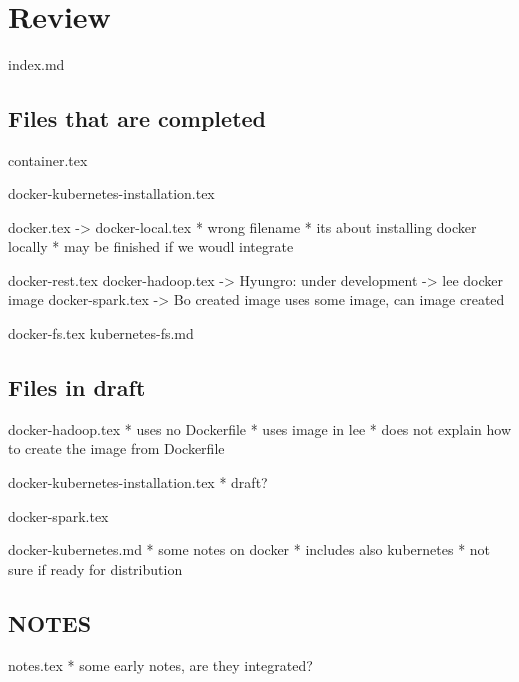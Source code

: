 \MDNAME\

\section{Review}

index.md

\subsection{Files that are completed}

container.tex

docker-kubernetes-installation.tex

docker.tex -\textgreater{} docker-local.tex * wrong filename * its about
installing docker locally * may be finished if we woudl integrate

docker-rest.tex docker-hadoop.tex -\textgreater{} Hyungro: under
development -\textgreater{} lee docker image docker-spark.tex
-\textgreater{} Bo created image uses some image, can image created

docker-fs.tex kubernetes-fs.md

\subsection{Files in draft}

docker-hadoop.tex * uses no Dockerfile * uses image in lee * does not
explain how to create the image from Dockerfile

docker-kubernetes-installation.tex * draft?

docker-spark.tex

docker-kubernetes.md * some notes on docker * includes also kubernetes *
not sure if ready for distribution

\subsection{NOTES}

notes.tex * some early notes, are they integrated?

